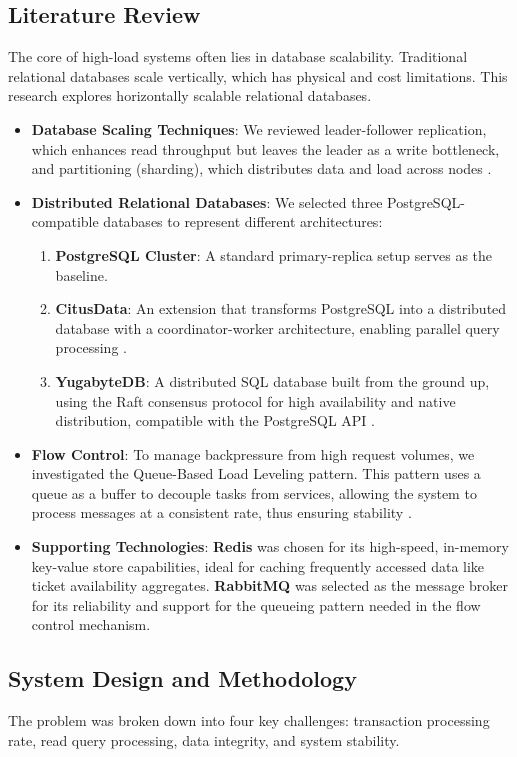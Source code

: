 \documentclass{ieeeaccess}
\begin{document}
\subsection{Literature Review}
The core of high-load systems often lies in database scalability. Traditional relational databases scale vertically, which has physical and cost limitations. This research explores horizontally scalable relational databases.
\begin{itemize}
\item \textbf{Database Scaling Techniques}: We reviewed leader-follower replication, which enhances read throughput but leaves the leader as a write bottleneck, and partitioning (sharding), which distributes data and load across nodes \cite{b2}.
\item \textbf{Distributed Relational Databases}: We selected three PostgreSQL-compatible databases to represent different architectures:
\begin{enumerate}
\item \textbf{PostgreSQL Cluster}: A standard primary-replica setup serves as the baseline.
\item \textbf{CitusData}: An extension that transforms PostgreSQL into a distributed database with a coordinator-worker architecture, enabling parallel query processing \cite{b3}.
\item \textbf{YugabyteDB}: A distributed SQL database built from the ground up, using the Raft consensus protocol for high availability and native distribution, compatible with the PostgreSQL API \cite{b4}.
\end{enumerate}
\item \textbf{Flow Control}: To manage backpressure from high request volumes, we investigated the Queue-Based Load Leveling pattern. This pattern uses a queue as a buffer to decouple tasks from services, allowing the system to process messages at a consistent rate, thus ensuring stability \cite{b5}.
\item \textbf{Supporting Technologies}: \textbf{Redis} was chosen for its high-speed, in-memory key-value store capabilities, ideal for caching frequently accessed data like ticket availability aggregates. \textbf{RabbitMQ} was selected as the message broker for its reliability and support for the queueing pattern needed in the flow control mechanism.
\end{itemize}

\subsection{System Design and Methodology}
The problem was broken down into four key challenges: transaction processing rate, read query processing, data integrity, and system stability.
\end{document}

